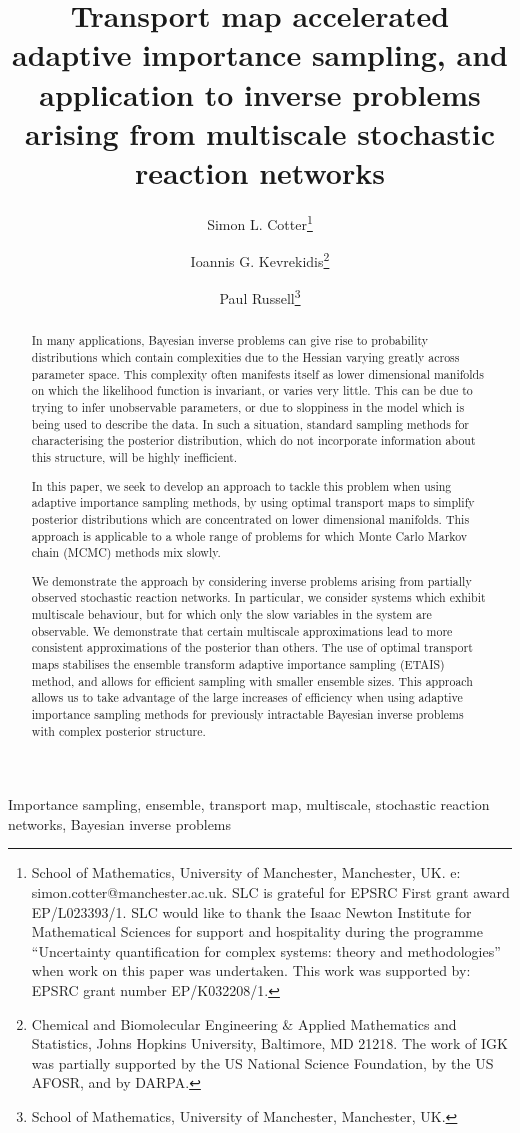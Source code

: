 \documentclass[final]{siamltex}
\author{Simon L. Cotter\thanks{School of
    Mathematics, University of Manchester, Manchester, UK. e:
    simon.cotter@manchester.ac.uk. SLC is grateful for EPSRC First
    grant award EP/L023393/1. SLC would like to thank the Isaac Newton
    Institute for Mathematical Sciences for support and hospitality
    during the programme ``Uncertainty quantification for complex systems: theory and methodologies'' when work on this paper was undertaken. This work was supported by:
EPSRC grant number EP/K032208/1.} \and Ioannis
G. Kevrekidis\thanks{Chemical and Biomolecular Engineering \& Applied
  Mathematics and Statistics, Johns Hopkins University, Baltimore, MD
  21218. The work of IGK was partially supported by the US National
  Science Foundation, by the US AFOSR, and by DARPA.} \and Paul
  Russell\thanks{School of
    Mathematics, University of Manchester, Manchester, UK.}}
\title{Transport map accelerated adaptive importance sampling, and application to inverse problems arising from
  multiscale stochastic reaction networks}
\newcommand{\edit}[1]{#1}
\begin{document}
\maketitle
\begin{abstract}
In many applications, Bayesian inverse problems can give rise to
probability distributions which contain complexities due to the
Hessian varying greatly across parameter space. This complexity often manifests itself as lower
dimensional manifolds on which the likelihood function is
invariant, or varies very little. This can be due to trying to infer
unobservable parameters, or due to sloppiness in the model which is
being used to describe the data. In such a situation, standard
sampling methods for characterising the posterior distribution, which
do not incorporate information about this structure, will be highly
inefficient. 

In this paper, we seek to develop an approach to
tackle this problem when using adaptive importance sampling methods,
by using optimal transport maps to simplify
posterior distributions which are concentrated on lower dimensional
manifolds. This approach is applicable to a whole range of
problems for which Monte Carlo Markov chain (MCMC) methods mix slowly.

We demonstrate the approach by considering inverse problems arising
from partially observed stochastic reaction networks. In particular,
we consider systems which exhibit multiscale behaviour, but for which
only the slow variables in the system are observable. We demonstrate
that certain multiscale approximations lead to more consistent
approximations of the posterior than others. The use of optimal
transport maps stabilises the ensemble transform adaptive importance
sampling (ETAIS) method, and allows for efficient sampling with
smaller ensemble sizes. \edit{This approach allows us to take
  advantage of the large increases of efficiency when using adaptive
  importance sampling methods for previously intractable Bayesian
  inverse problems with complex posterior structure.}
\end{abstract}
\begin{keywords}Importance sampling, ensemble, transport map,
  multiscale, stochastic reaction networks, Bayesian inverse problems
\end{keywords}
\end{document}
